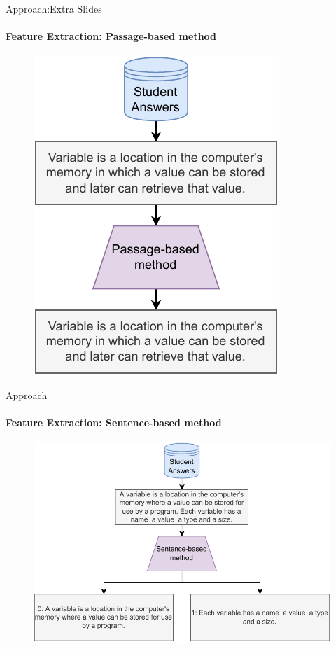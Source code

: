 \documentclass[aspectratio=169]{beamer}
\begin{document}
\begin{frame}{Approach:Extra Slides}
\framesubtitle{Feature Extraction: Passage-based method}
\begin{figure}
\centering
\includegraphics[scale = 0.65]{images/passage_FE.pdf}
\label{fig:passage fe}
\end{figure}
\end{frame}
\begin{frame}{Approach}
\framesubtitle{Feature Extraction: Sentence-based method}
\begin{figure}
\centering
\includegraphics[scale = 0.65]{images/sentence_FE.pdf}
\label{fig:sentence fe}
\end{figure}
\end{frame}
\end{document}
